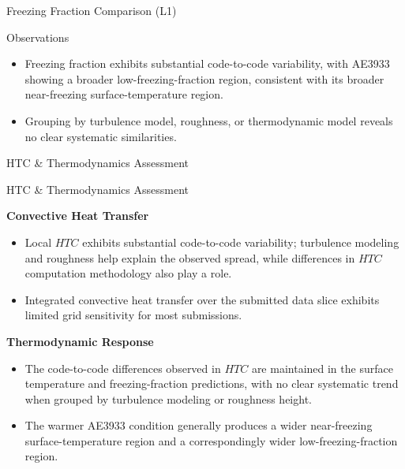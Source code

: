 \begin{frame}{\small  Freezing Fraction Comparison (L1)}
\vspace{-0.15cm}

\begin{block}{\scriptsize Observations}
\begin{itemize}
    \item<1-> Freezing fraction exhibits substantial code-to-code variability, with AE3933 showing a broader low-freezing-fraction region, consistent with its broader near-freezing surface-temperature region.
    \item<2-> Grouping by turbulence model, roughness, or thermodynamic model reveals no clear systematic similarities.
\end{itemize}
\end{block}

\end{frame}



\begin{frame}{\small HTC \& Thermodynamics Assessment}
\scriptsize

\begin{alertblock}{\scriptsize HTC \& Thermodynamics Assessment}

\textbf{Convective Heat Transfer}
\begin{itemize}
    \item Local $HTC$ exhibits substantial code-to-code variability; turbulence modeling and roughness help explain the observed spread, while differences in $HTC$ computation methodology also play a role.
    
    \item Integrated convective heat transfer over the submitted data slice exhibits limited grid sensitivity for most submissions.
\end{itemize}

\vspace{0.10cm}

\textbf{Thermodynamic Response}
\begin{itemize}
    \item The code-to-code differences observed in $HTC$ are maintained in the surface temperature and freezing-fraction predictions, with no clear systematic trend when grouped by turbulence modeling or roughness height.
    
    \item The warmer AE3933 condition generally produces a wider near-freezing surface-temperature region and a correspondingly wider low-freezing-fraction region.
\end{itemize}

\end{alertblock}

\end{frame}